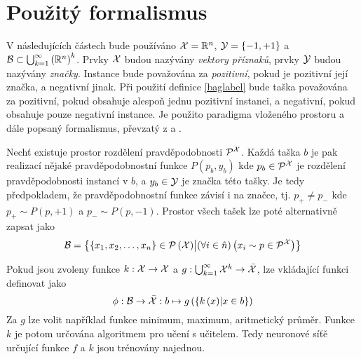 \section{Použitý formalismus}\label{used_formalism}
V následujících částech bude používáno \( \mathcal X = \mathbb R^n \), \( \mathcal Y = \left\{ -1, +1 \right\} \) a \( \mathcal B \subset \bigcup_{k = 1}^{\infty} \left( \mathbb R^n \right) ^k \). Prvky \( \mathcal X \) budou nazývány \textit{vektory příznaků}, prvky \( \mathcal Y \) budou nazývány \textit{značky}. Instance bude považována za \textit{pozitivní}, pokud je pozitivní její značka, a negativní jinak. Při použití definice \ref{baglabel} bude taška považována za pozitivní, pokud obsahuje alespoň jednu pozitivní instanci, a negativní, pokud obsahuje pouze negativní instance. Je použito paradigma vloženého prostoru a dále popsaný formalismus, převzatý z \cite{pevny_using_2016} a \cite{pevny_discriminative_2016}.

Nechť existuje prostor rozdělení pravděpodobnosti \( \mathcal P^{\mathcal X} \). Každá taška \( b \) je pak realizací nějaké pravděpodobnostní funkce \( P \left( p_b, y_b \right) \) kde \( p_b \in \mathcal P^{\mathcal X} \) je rozdělení pravděpodobnosti instancí v \( b \), a \( y_b \in \mathcal Y \) je značka této tašky. Je tedy předpokladem, že pravděpodobnostní funkce závisí i na značce, tj. \( p_+ \neq p_- \) kde \( p_+ \sim P(p, +1) \) a \( p_- \sim P(p, -1) \). Prostor všech tašek lze poté alternativně zapsat jako
\begin{equation}
	\mathcal B = \left\{ \left\{ x_1, x_2, \dots, x_n \right\} \in \mathcal P \left( \mathcal X \right) \middle| \left( \forall i \in \hat n \right) \left( x_i \sim p \in \mathcal P^{\mathcal X} \right) \right\}
\end{equation}

Pokud jsou zvoleny funkce \( k : \mathcal X \to \mathcal X \) a \( g : \bigcup_{k = 1}^{\infty} \mathcal X^k \to \bar{\mathcal X} \), lze vkládající funkci definovat jako
\begin{equation}\label{net_pooling}
	\phi : \mathcal B \to \bar{\mathcal X} : b \mapsto g \left( \left\{ k \left( x \right) \middle| x \in b \right\} \right)
\end{equation}
Za \( g \) lze volit například funkce minimum, maximum, aritmetický průměr. Funkce \( k \) je potom určována algoritmem pro učení s učitelem. Tedy neuronové síťě určující funkce \( f \) a \( k \) jsou trénovány najednou.
